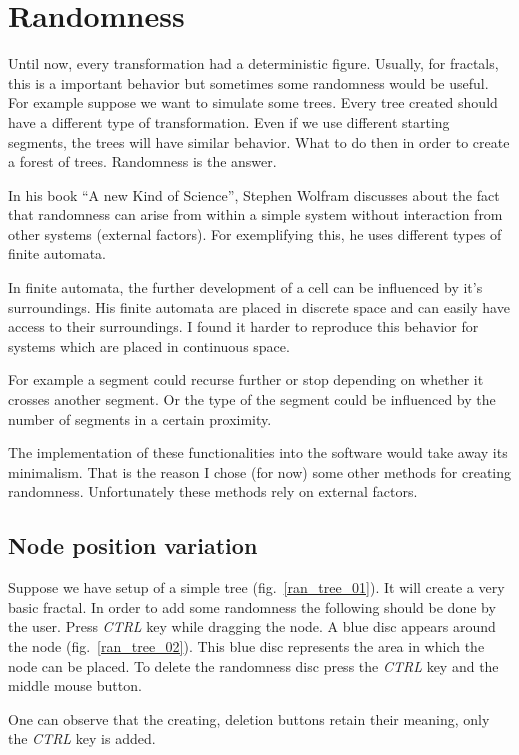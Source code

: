\section{Randomness}

	Until now, every transformation had a deterministic figure.
	Usually, for fractals, this is a important behavior but sometimes some randomness would be useful.
	For example suppose we want to simulate some trees.
	Every tree created should have a different type of transformation.
	Even if we use different starting segments, the trees will have similar behavior.
	What to do then in order to create a forest of trees.
	Randomness is the answer.

	In his book ``A new Kind of Science'', Stephen Wolfram discusses about the fact that randomness can arise from within a simple system without interaction from other systems (external factors).
	For exemplifying this, he uses different types of finite automata.

	In finite automata, the further development of a cell can be influenced by it's surroundings.
	His finite automata are placed in discrete space and can easily have access to their surroundings.
	I found it harder to reproduce this behavior for systems which are placed in continuous space.

	For example a segment could recurse further or stop depending on whether it crosses another segment.
	Or the type of the segment could be influenced by the number of segments in a certain proximity.

	The implementation of these functionalities into the software would take away its minimalism.
	That is the reason I chose (for now) some other methods for creating randomness.
	Unfortunately these methods rely on external factors.

	\subsection{Node position variation}

		Suppose we have setup of a simple tree (fig.~\ref{ran_tree_01}).
		It will create a very basic fractal.
		In order to add some randomness the following should be done by the user.
		Press \emph{CTRL} key while dragging the node.
		A blue disc appears around the node (fig.~\ref{ran_tree_02}).
		This blue disc represents the area in which the node can be placed.
		To delete the randomness disc press the \emph{CTRL} key and the middle mouse button.

		One can observe that the creating, deletion buttons retain their meaning,
			only the \emph{CTRL} key is added.

